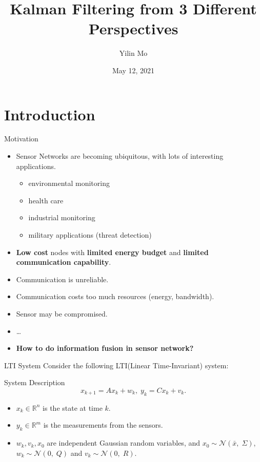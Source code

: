 \documentclass[10pt]{beamer}
\title[Kalman Filter]{Kalman Filtering from 3 Different Perspectives}
\author[Yilin Mo]{Yilin Mo}
\institute[Tsinghua]{Department of Automation, Tsinghua University}
\date[May 12, 2021]{May 12, 2021}
\DeclareMathOperator{\1}{\textbf{1}}
\begin{document}
\begin{frame}
  \titlepage
\end{frame}

\frame{\tableofcontents}

\section{Introduction}
\begin{frame}{Motivation}
  \begin{itemize}
    \item Sensor Networks are becoming ubiquitous, with lots of interesting applications.
      \begin{itemize}
	\item environmental monitoring
	\item health care
	\item industrial monitoring
	\item military applications (threat detection)
      \end{itemize}
  \item {\bf Low cost} nodes with {\bf limited energy budget} and {\bf limited communication capability}.
    \item Communication is unreliable. 
    \item Communication costs too much resources (energy, bandwidth). 
    \item Sensor may be compromised.
    \item \ldots
    \item \bf How to do information fusion in sensor network?
  \end{itemize}
\end{frame}

\begin{frame}{LTI System}
  Consider the following LTI(Linear Time-Invariant) system:
  \begin{block}{System Description}
      \begin{displaymath}
	x_{k+1} = Ax_k +  w_k,\; y_{k} = C x_k + v_k.
      \end{displaymath}
    \end{block}
    \begin{itemize}
      \item $x_k \in \mathbb R^n$ is the state at time $k$.
      \item  $y_k \in \mathbb R^m$ is the measurements from the sensors. 
      \item $w_k,v_k,x_0$ are independent Gaussian random variables, and $x_0 \sim \mathcal N(\bar x,\;\Sigma)$, $w_k \sim \mathcal N(0,\;Q)$ and $v_k \sim \mathcal N(0,\;R)$. 
    \end{itemize}
  \end{frame}
\end{document}

